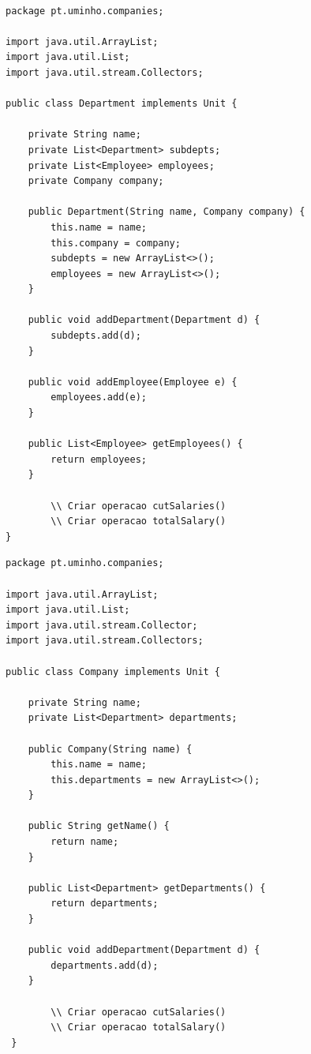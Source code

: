 \documentclass{article}
\begin{document}
\begin{lstlisting}[caption={Classe Department},label={anoniTolambda},captionpos=t]

package pt.uminho.companies;

import java.util.ArrayList;
import java.util.List;
import java.util.stream.Collectors;

public class Department implements Unit {

	private String name;
	private List<Department> subdepts;
	private List<Employee> employees;
	private Company company;

	public Department(String name, Company company) {
		this.name = name;
		this.company = company;
		subdepts = new ArrayList<>();
		employees = new ArrayList<>();
	}

	public void addDepartment(Department d) {
		subdepts.add(d);
	}

	public void addEmployee(Employee e) {
		employees.add(e);
	}

	public List<Employee> getEmployees() {
		return employees;
	}

        \\ Criar operacao cutSalaries()
        \\ Criar operacao totalSalary()
}
\end{lstlisting}

\newpage

\begin{lstlisting}[caption={Classe Company},label={anoniTolambda},captionpos=t]
package pt.uminho.companies;

import java.util.ArrayList;
import java.util.List;
import java.util.stream.Collector;
import java.util.stream.Collectors;

public class Company implements Unit {

	private String name;
	private List<Department> departments;

	public Company(String name) {
		this.name = name;
		this.departments = new ArrayList<>();
	}

	public String getName() {
		return name;
	}

	public List<Department> getDepartments() {
		return departments;
	}

	public void addDepartment(Department d) {
		departments.add(d);
	}

        \\ Criar operacao cutSalaries()
        \\ Criar operacao totalSalary()
 }
\end{lstlisting}
\end{document}
